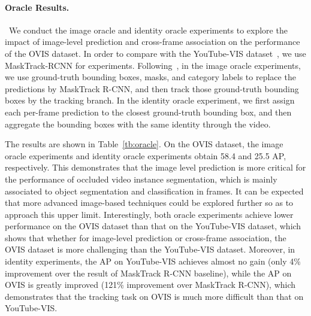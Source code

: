 \documentclass[twocolumn]{svjour3}          \smartqed  \usepackage{graphicx}
\def\myTextColor{\textcolor[rgb]{0, 0, 0}}
\begin{document}
\begin{sloppypar}
\begin{table}\centering
{}
\caption{Oracle results on OVIS and YouTube-VIS. The number in the brackets means the performance improvement ratio over the corresponding baseline.}
\label{tb:oracle}
\end{table}

\paragraph{Oracle Results.}~We conduct the image oracle and identity oracle experiments to explore the impact of image-level prediction and cross-frame association on the performance of the OVIS dataset. In order to compare with the YouTube-VIS dataset~\cite{youtube_vis}, we use MaskTrack-RCNN for experiments. Following~\cite{youtube_vis}, in the image oracle experiments, we use ground-truth bounding boxes, masks, and category labels to replace the predictions by MaskTrack R-CNN, and then track those ground-truth bounding boxes by the tracking branch. In the identity oracle experiment, we first assign each per-frame prediction to the closest ground-truth bounding box, and then aggregate the bounding boxes with the same identity through the video.

The results are shown in Table~\ref{tb:oracle}. On the OVIS dataset, the image oracle experiments and identity oracle experiments obtain 58.4 and 25.5 AP, respectively. \myTextColor{This demonstrates that the image level prediction is more critical for the performance of occluded video instance segmentation, which is mainly associated to object segmentation and classification in frames. It can be expected that more advanced image-based techniques could be explored further so as to approach this upper limit.} Interestingly, both oracle experiments achieve lower performance on the OVIS dataset than that on the YouTube-VIS dataset, which shows that whether for image-level prediction or cross-frame association, the OVIS dataset is more challenging than the YouTube-VIS dataset.
Moreover, in identity experiments, the AP on YouTube-VIS achieves almost no gain (only 4\% improvement over the result of MaskTrack R-CNN baseline), while the AP on OVIS is greatly improved (121\% improvement over MaskTrack R-CNN), which demonstrates that the tracking task on OVIS is much more difficult than that on YouTube-VIS.



\end{sloppypar}
\end{document}
